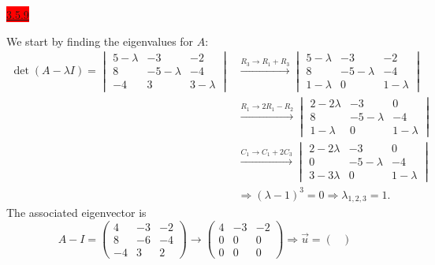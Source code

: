\documentclass{exam}
\begin{document}
\colorbox{red}{\underline{3.5.9}}
\begin{solution}
    We start by finding the eigenvalues for $A$:
    \begin{align*}
        \det(A-\lambda I) = \begin{vmatrix}
            5 - \lambda & -3 & -2 \\
            8 & -5-\lambda & -4 \\
            -4 & 3 & 3 - \lambda
        \end{vmatrix}
        &\xrightarrow{R_3 \to R_1 + R_3}
        \begin{vmatrix}
            5 - \lambda & -3 & -2 \\
            8 & -5-\lambda & -4 \\
            1 - \lambda & 0 & 1 - \lambda
        \end{vmatrix} \\
        &\xrightarrow{R_1 \to 2R_1 - R_2}
        \begin{vmatrix}
            2 - 2\lambda & -3 & 0 \\
            8 & -5-\lambda & -4 \\
            1 - \lambda & 0 & 1 - \lambda
        \end{vmatrix} \\
        &\xrightarrow{C_1 \to C_1 + 2C_3}
        \begin{vmatrix}
            2 - 2\lambda & -3 & 0 \\
            0 & -5-\lambda & -4 \\
            3 - 3\lambda & 0 & 1 - \lambda
        \end{vmatrix} \\
        &\Rightarrow (\lambda -1)^3 = 0 \Rightarrow \lambda_{1, 2, 3} = 1.
    \end{align*}
    The associated eigenvector is 
    \[
        A - I = \begin{pmatrix}
            4 & -3 & -2 \\
            8 & -6 & -4 \\
            -4 & 3 & 2
        \end{pmatrix} 
        \xrightarrow{}
        \begin{pmatrix}
            4 & -3 & -2 \\
            0 & 0 & 0 \\
            0 & 0 & 0 
        \end{pmatrix} 
        \Rightarrow \vec{u} = \begin{pmatrix}

\end{pmatrix}\]
\end{solution}
\end{document}
